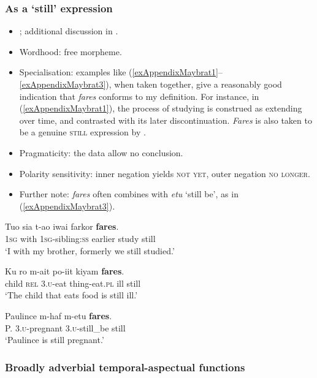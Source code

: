 \subsubsection{As a \lq{}still\rq{ }expression}
\begin{itemize}
	\item \textcite[160–161, 173]{Dol2007}; additional discussion in \textcite[55]{vanBaar1997}.
	\item Wordhood: free morpheme.
	\item Specialisation: examples like (\ref{exAppendixMaybrat1}–\ref{exAppendixMaybrat3}), when taken together, give a reasonably good indication that \textit{fares} conforms to my definition. For instance, in (\ref{exAppendixMaybrat1}), the process of studying is construed as extending over time, and contrasted with its later discontinuation. \textit{Fares} is also taken to be a genuine \textsc{still} expression by \textcite{vanBaar1997}.
	\item Pragmaticity: the data allow no conclusion.
	\item Polarity sensitivity: inner negation yields \textsc{not yet}, outer negation \textsc{no longer}.
	\item Further note: \textit{fares} often combines with \textit{etu} \lq still be', as in (\ref{exAppendixMaybrat3}).
\end{itemize}

\begin{exe}
	\ex\label{exAppendixMaybrat1}
	\gll Tuo sia t-ao iwai farkor \textbf{fares}.\\
	1\textsc{sg} with 1\textsc{sg}-sibling:\textsc{ss} earlier study still\\
	\glt \lq I with my brother, formerly we still studied.' \parencite[160]{Dol2007}
	
	\ex\label{exAppendixMaybrat2}
	\gll Ku ro m-ait po-iit kiyam \textbf{fares}.\\
	child \textsc{rel} 3.\textsc{u}-eat thing-eat.\textsc{pl} ill still\\
	\glt \lq The child that eats food is still ill.' \parencite[150]{Dol2007}

	\ex\label{exAppendixMaybrat3}
	\gll Paulince m-haf m-etu \textbf{fares}.\\
		P. 3.\textsc{u}-pregnant 3.\textsc{u}-still\_be still\\
	\glt \lq Paulince is still pregnant.' \parencite[160]{Dol2007}
\end{exe}

\subsubsection{Broadly adverbial temporal-aspectual functions}
